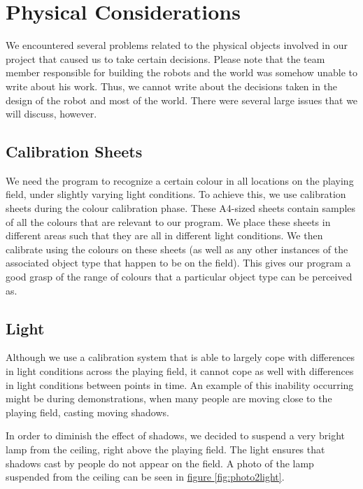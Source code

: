 \documentclass[10pt, abstracton, twocolumn]{scrartcl}
\newcommand{\fref}[1]{\hyperref[#1]{figure \vref{#1}}}
\begin{document}
\section{Physical Considerations}
We encountered several problems related to the physical objects involved in our project that caused us to take certain decisions. Please note that the team member responsible for building the robots and the world was somehow unable to write about his work. Thus, we cannot write about the decisions taken in the design of the robot and most of the world. There were several large issues that we will discuss, however.

\subsection{Calibration Sheets}
We need the program to recognize a certain colour in all locations on the playing field, under slightly varying light conditions. To achieve this, we use calibration sheets during the colour calibration phase. These A4-sized sheets contain samples of all the colours that are relevant to our program. We place these sheets in different areas such that they are all in different light conditions. We then calibrate using the colours on these sheets (as well as any other instances of the associated object type that happen to be on the field). This gives our program a good grasp of the range of colours that a particular object type can be perceived as.

\subsection{Light}
Although we use a calibration system that is able to largely cope with differences in light conditions across the playing field, it cannot cope as well with differences in light conditions between points in time. An example of this inability occurring might be during demonstrations, when many people are moving close to the playing field, casting moving shadows.

In order to diminish the effect of shadows, we decided to suspend a very bright lamp from the ceiling, right above the playing field. The light ensures that shadows cast by people do not appear on the field. A photo of the lamp suspended from the ceiling can be seen in \fref{fig:photo2light}.
\end{document}
